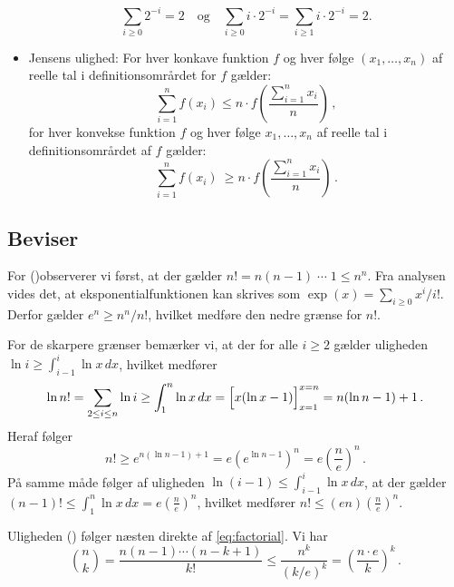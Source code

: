\begin{itemize}
    \begin{equation}\label{eq:ipowi}
      \sum_{i \ge 0} 2^{-i} = 2 \quad\text{og}\quad \sum_{i\geq 0}i\cdot 2^{-i}=
      \sum_{i\geq 1}i\cdot 2^{-i}=2 .
    \end{equation}

  \item Jensens ulighed:
    For hver konkave funktion $f$ og hver følge $(x_1,\ldots,x_n)$ af reelle tal i definitionsområrdet for $f$ gælder:
    \begin{equation}\label{eq:concave}
      \sum_{i=1}^n f(x_i)\leq n\cdot f\left(\frac{\sum_{i=1}^n x_i}{n}\right)\,,
    \end{equation}%
    for hver konvekse funktion $f$ og hver følge $x_1,\ldots,x_n$ af reelle tal i definitionsområrdet af $f$ gælder:
    \begin{equation}\label{eq:convex}
      \sum_{i=1}^n f(x_i)\ \ge n\cdot f\left(\frac{\sum_{i=1}^n x_i}{n}\right)\,.
    \end{equation}
\end{itemize}

\subsection{Beviser}

For ()observerer vi først, at der gælder $n! = n(n-1)\;\cdots\; 1 \le n^n$. 
Fra analysen vides det, at eksponentialfunktionen kan skrives som 
$\exp(x)=\sum_{i\ge 0}x^i/i!$.
Derfor gælder $e^n \ge n^n/n!$, hvilket medføre den nedre grænse for $n!$. 

\smallskip
For de skarpere grænser bemærker vi, at der for alle $i\ge2$ gælder uligheden 
$\ln i \ge \int_{i-1}^{i} \ln x \, dx$, hvilket medfører
\[ \ln n! = \sum_{2 \le i \le n} \ln i \ge \int_1^{n} \ln x \, dx =
\Bigl[ x (\ln x - 1)
\Bigr]_{x = 1}^{x = n} = n (\ln n - 1) + 1  \,. \]
Heraf følger
\[ n! \ge e^{n (\ln n - 1)+1} = e(e^{\ln n - 1})^n = e\left(\frac{n}{e}\right)^n \,. \]
På samme måde følger af uligheden $\ln (i-1) \le \int_{i-1}^{i} \ln x \, dx$,
at der gælder $(n-1)! \le \int_1^{n} \ln x \, dx = e\left(\frac{n}{e}\right)^n$, hvilket medfører $n! \le (en)\left(\frac{n}{e}\right)^n$.

Uligheden () følger næsten direkte af \eqref{eq:factorial}. 
Vi har
\[  \binom{n}{k} = \frac{n(n-1)\cdots(n - k+1)}{k!} \le \frac{n^k}{(k/e)^k} = \left(\frac{n\cdot e}{k}\right)^k \,. \]
\smallskip


